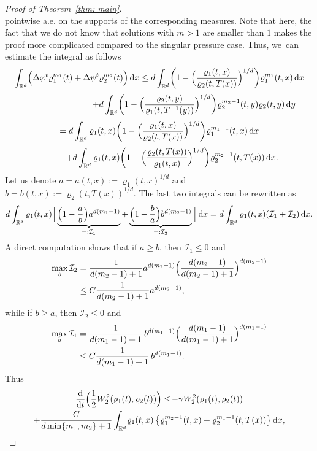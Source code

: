 \documentclass[JEP,XML,SOM,Unicode,published]{cedram}
\newcommand{\Bprt}[1]{\Bigl(#1\Bigr)}
\newcommand{\bbprt}[1]{\biggl(#1\biggr)}
\newcommand{\curlyI}{\mathcal{I}}
\newcommand{\dx}[1]{\mathop{}\!\mathrm{d} #1}
\newcommand{\ddt}{\frac{\dx{}}{\dx{t}}}
\newcommand{\R}{\mathbb{R}}
\theoremstyle{plain}
\theoremstyle{remark}
\begin{document}
\begin{proof}[Proof of Theorem~\ref{thm: main}]
\[\]
pointwise a.e. on the supports of the corresponding measures. Note that here, the fact that we do not know that solutions with $m>1$ are smaller than $1$ makes the proof more complicated compared to the singular pressure case.
Thus, we~can estimate the integral as follows
\begin{multline*}
\int_{\R^d} \Bprt{\Delta \varphi^t \varrho_1^{m_1}(t) +\Delta \psi^t \varrho_2^{m_2}(t) }\dx x
\leq d \int_{\R^d} \bbprt{1-\Bprt{\frac{\varrho_1(t,x)}{\varrho_2(t,T(x))}}^{1/d}} \varrho_1^{m_1}(t,x)\dx x \\[3pt]
\shoveright{+ d \int_{\R^d} \bbprt{1-\Bprt{\frac{\varrho_2(t,y)}{\varrho_1(t,T^{-1}(y))}}^{1/d}} \varrho_2^{m_2-1}(t,y) \varrho_2(t,y)\dx y}\\[3pt]
= d \int_{\R^d} \varrho_1(t,x) \bbprt{1-\Bprt{\frac{\varrho_1(t,x)}{\varrho_2(t,T(x))}}^{1/d}} \varrho_1^{m_1-1}(t,x) \dx x \\[3pt]
\qquad\quad + d\int_{\R^d}\varrho_1(t,x)\bbprt{1-\Bprt{\frac{\varrho_2(t,T(x))}{\varrho_1(t,x)}}^{1/d}} \varrho_2^{m_2-1}(t,T(x))\dx x.
\end{multline*}
Let us denote $a=a(t,x):= \varrho_1(t,x)^{1/d}$ and $b=b(t,x):=\varrho_2(t,T(x))^{1/d}$. The last two integrals can be rewritten as
\[
d \int_{\R^d} \varrho_1(t,x) \Big[\underbrace{\Bprt{1-\frac ab } a^{d(m_1-1)}}_{=:\curlyI_1} + \underbrace{\Bprt{1-\frac ba} b^{d(m_2-1)}}_{=:\curlyI_2}\Big]\dx x
= d \int_{\R^d} \varrho_1(t,x) (\curlyI_1 + \curlyI_2) \dx x.
\]
A direct computation shows that if $a\ge b$, then $\curlyI_1\le 0$ and
\begin{align*}
\max_b \curlyI_2 &= \frac{1}{d(m_2-1)+1} a^{d(m_2-1)} \Bigl(\frac{d(m_2-1)}{d(m_2-1)+1}\Bigr)^{d(m_2-1)} \\
&\leq C \frac{1}{d(m_2-1)+1}a^{d(m_2-1)},
\end{align*}
while if $b\ge a$, then $\curlyI_2\le 0$ and
\begin{align*}
\max_b \curlyI_1 &= \frac{1}{d(m_1-1)+1}\, b^{d(m_1-1)} \Bigl(\frac{d(m_1-1)}{d(m_1-1)+1}\Bigr)^{d(m_1-1)} \\
&\leq C \frac{1}{d(m_1-1)+1}\,b^{d(m_1-1)}.
\end{align*}
Thus
\begin{multline*}\label{intermediate}
\ddt\Bprt{\frac 12 W_2^2(\varrho_1(t), \varrho_2(t))}\leq \!- \gamma W_2^2(\varrho_1(t), \varrho_2(t))\\
+ \frac{C}{d\min\{m_1,m_2\}+1} \int_{\R^d}\! \varrho_1(t,x)\left\{\varrho_1^{m_2-1}(t,x)+\varrho_2^{m_1-1}(t,T(x))\right\}\dx x,
\end{multline*}

\end{proof}
\end{document}
